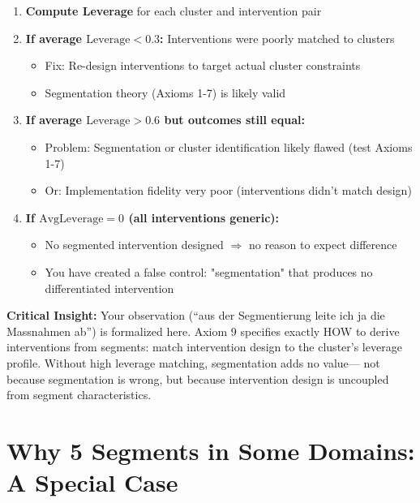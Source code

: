 \begin{tcolorbox}[colback=blue!5!white, colframe=blue!75!black,
    title=Axiom SEG-MATCH-9: Specificity-Matching Principle]
\begin{enumerate}
\item \textbf{Compute Leverage} for each cluster and intervention pair
\item \textbf{If average $\text{Leverage} < 0.3$:} Interventions were poorly matched to clusters
  \begin{itemize}[nosep]
  \item Fix: Re-design interventions to target actual cluster constraints
  \item Segmentation theory (Axioms 1-7) is likely valid
  \end{itemize}
\item \textbf{If average $\text{Leverage} > 0.6$ but outcomes still equal:}
  \begin{itemize}[nosep]
  \item Problem: Segmentation or cluster identification likely flawed (test Axioms 1-7)
  \item Or: Implementation fidelity very poor (interventions didn't match design)
  \end{itemize}
\item \textbf{If $\text{AvgLeverage} = 0$ (all interventions generic):}
  \begin{itemize}[nosep]
  \item No segmented intervention designed $\Rightarrow$ no reason to expect difference
  \item You have created a false control: "segmentation" that produces no differentiated intervention
  \end{itemize}
\end{enumerate}

\textbf{Critical Insight:}
Your observation (``aus der Segmentierung leite ich ja die Massnahmen ab'') is formalized here.
Axiom 9 specifies exactly HOW to derive interventions from segments: match intervention design
to the cluster's leverage profile. Without high leverage matching, segmentation adds no value---
not because segmentation is wrong, but because intervention design is uncoupled from segment characteristics.

\end{tcolorbox}

\section{Why 5 Segments in Some Domains: A Special Case}
\label{sec:ba-why-five}

